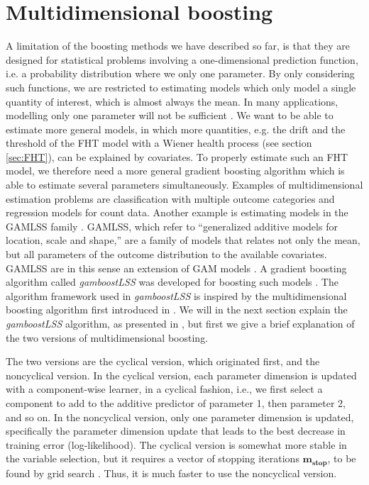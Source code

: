 
\section{Multidimensional boosting}
A limitation of the boosting methods we have described so far, is that they are designed for statistical problems involving a one-dimensional prediction function, i.e. a probability distribution where we only one parameter.
By only considering such functions, we are restricted to estimating models which only model a single quantity of interest, which is almost always the mean.
In many applications, modelling only one parameter will not be sufficient \citep{kneib2013}.
We want to be able to estimate more general models, in which more quantities, e.g. the drift and the threshold of the FHT model with a Wiener health process (see section \ref{sec:FHT}), can be explained by covariates.
To properly estimate such an FHT model, we therefore need a more general gradient boosting algorithm which is able to estimate several parameters simultaneously.
Examples of multidimensional estimation problems are classification with multiple outcome categories and regression models for count data.
Another example is estimating models in the GAMLSS family \citep{gamlss}.
GAMLSS, which refer to ``generalized additive models for location, scale and shape,'' are a family of models that relates not only the mean, but all parameters of the outcome distribution to the available covariates.
GAMLSS are in this sense an extension of GAM models \citep{gam-book}.
A gradient boosting algorithm called \textit{gamboostLSS} was developed for boosting such models \citep{gamboostlss-paper}.
The algorithm framework used in \textit{gamboostLSS} is inspired by the multidimensional boosting algorithm first introduced in \citet{schmid}.
We will in the next section explain the \textit{gamboostLSS} algorithm, as presented in \citet{gamboostlss-paper}, but first we give a brief explanation of the two versions of multidimensional boosting.

The two versions are the cyclical version, which originated first, and the noncyclical version.
In the cyclical version, each parameter dimension is updated with a component-wise learner, in a cyclical fashion, i.e., we first select a component to add to the additive predictor of parameter 1, then parameter 2, and so on.
In the noncyclical version, only one parameter dimension is updated, specifically the parameter dimension update that leads to the best decrease in training error (log-likelihood).
The cyclical version is somewhat more stable in the variable selection, but it requires a vector of stopping iterations $\boldsymbol{m_{\text{stop}}}$, to be found by grid search \citep{thomas2018}.
Thus, it is much faster to use the noncyclical version.

